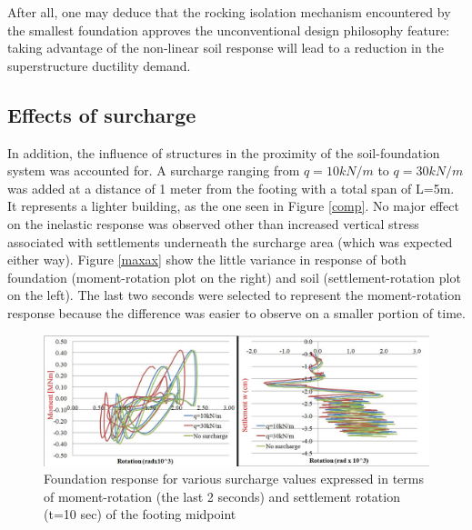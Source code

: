 

After all, one may deduce that the rocking isolation mechanism encountered by the smallest foundation approves the unconventional design philosophy feature: taking advantage of the non-linear soil response will lead to a reduction in the superstructure ductility demand. 


\subsection{Effects of surcharge}
In addition, the influence of structures in the proximity of the soil-foundation system was \mbox{accounted} for. A surcharge ranging from $q=10kN/m$ to $q=30kN/m$ was added at a distance of 1 meter from the footing with a total span of L=5m. It represents a lighter building, as the one seen in Figure \ref{comp}. No major effect on the inelastic response was observed other than increased vertical stress associated with settlements underneath the surcharge area (which was expected either way). Figure \ref{maxax} show the little variance in response of both foundation (moment-rotation plot on the right) and soil (settlement-rotation plot on the left). The last two seconds were selected to represent the moment-rotation response because the difference was easier to observe on a smaller portion of time.

	\begin{figure}[!h]
		\centering
		\includegraphics[width=0.9 \linewidth]{"surcharge2"}
		\caption{Foundation response for various surcharge values expressed in terms of moment-rotation (the last 2 seconds) and settlement rotation (t=10 sec) of the footing midpoint}
		\label{surch}
	\end{figure}

